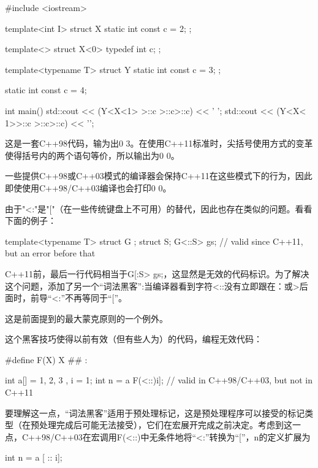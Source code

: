 \begin{cpp}
#include <iostream>

template<int I> struct X {
	static int const c = 2;
};

template<> struct X<0> {
	typedef int c;
};

template<typename T> struct Y {
	static int const c = 3;
};

static int const c = 4;

int main()
{
	std::cout << (Y<X<1> >::c >::c>::c) << ' ';
	std::cout << (Y<X< 1>>::c >::c>::c) << '\n';
}
\end{cpp}

这是一套C++98代码，输为出0 3。在使用C++11标准时，尖括号使用方式的变革使得括号内的两个语句等价，所以输出为0 0。

\begin{notice}
一些提供C++98或C++03模式的编译器会保持C++11在这些模式下的行为，因此即使使用C++98/C++03编译也会打印0 0。
\end{notice}

由于"<:"是"["（在一些传统键盘上不可用）的替代，因此也存在类似的问题。看看下面的例子：

\begin{cpp}
template<typename T> struct G {};
struct S;
G<::S> gs; // valid since C++11, but an error before that
\end{cpp}

C++11前，最后一行代码相当于G[:S> gs;，这显然是无效的代码标识。为了解决这个问题，添加了另一个“词法黑客”:当编译器看到字符<::没有立即跟在：或>后面时，前导“<:”不再等同于“[”。

\begin{notice}
这是前面提到的最大蒙克原则的一个例外。
\end{notice}

这个黑客技巧使得以前有效（但有些人为）的代码，编程无效代码：

\begin{cpp}
#define F(X) X ## :

int a[] = { 1, 2, 3 }, i = 1;
int n = a F(<::)i]; // valid in C++98/C++03, but not in C++11
\end{cpp}

要理解这一点，“词法黑客”适用于预处理标记，这是预处理程序可以接受的标记类型（在预处理完成后可能无法接受），它们在宏展开完成之前决定。考虑到这一点，C++98/C++03在宏调用F(<::)中无条件地将“<:”转换为“[”，n的定义扩展为

\begin{cpp}
int n = a [ :: i];
\end{cpp}

